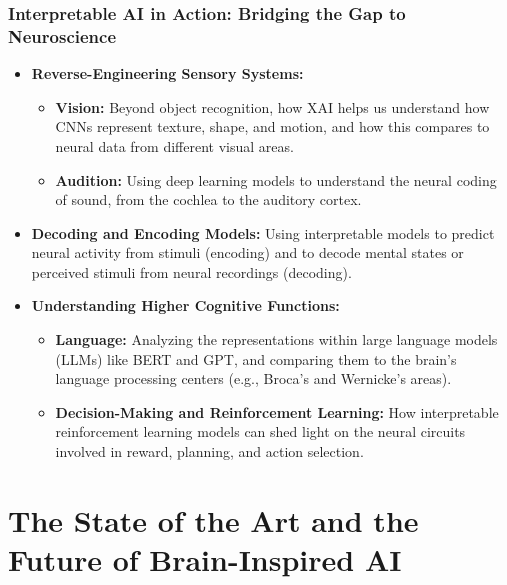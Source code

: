 \documentclass[11pt,a4paper]{article}
\begin{document}
\section{Interpretable AI in Action: Bridging the Gap to Neuroscience}
\begin{itemize}
    \item \textbf{Reverse-Engineering Sensory Systems:}
        \begin{itemize}
            \item \textbf{Vision:} Beyond object recognition, how XAI helps us understand how CNNs represent texture, shape, and motion, and how this compares to neural data from different visual areas.
            \item \textbf{Audition:} Using deep learning models to understand the neural coding of sound, from the cochlea to the auditory cortex.
        \end{itemize}
    \item \textbf{Decoding and Encoding Models:} Using interpretable models to predict neural activity from stimuli (encoding) and to decode mental states or perceived stimuli from neural recordings (decoding).
    \item \textbf{Understanding Higher Cognitive Functions:}
        \begin{itemize}
            \item \textbf{Language:} Analyzing the representations within large language models (LLMs) like BERT and GPT, and comparing them to the brain's language processing centers (e.g., Broca's and Wernicke's areas).
            \item \textbf{Decision-Making and Reinforcement Learning:} How interpretable reinforcement learning models can shed light on the neural circuits involved in reward, planning, and action selection.
        \end{itemize}
\end{itemize}

\clearpage

\part{The State of the Art and the Future of Brain-Inspired AI}
\end{document}
